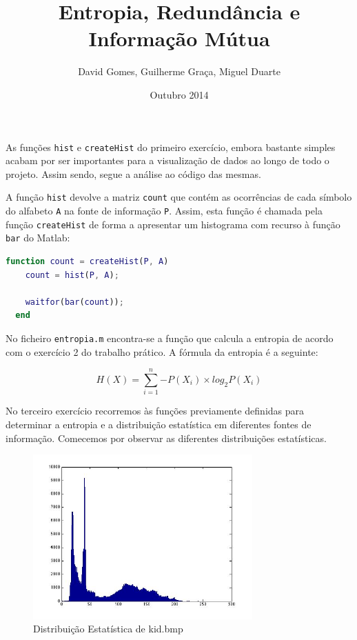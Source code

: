\documentclass[12pt]{article}
\title{Entropia, Redundância e Informação Mútua}
\author{David Gomes, Guilherme Graça, Miguel Duarte}
\date{Outubro 2014}
\begin{document}
\maketitle
  As funções \texttt{hist} e \texttt{createHist} do primeiro exercício, embora bastante
  simples acabam por ser importantes para a visualização de dados ao longo
  de todo o projeto. Assim sendo, segue a análise ao código das mesmas.

  A função \texttt{hist} devolve a matriz \texttt{count} que contém as ocorrências
  de cada símbolo do alfabeto \texttt{A} na fonte de informação \texttt{P}. Assim,
  esta função é chamada pela função \texttt{createHist} de forma a apresentar um histograma
  com recurso à função \texttt{bar} do Matlab:

  \vspace{2mm}
  \begin{lstlisting}[language=Matlab]
  function count = createHist(P, A)
    count = hist(P, A);

    waitfor(bar(count));
  end
  \end{lstlisting}

  No ficheiro \texttt{entropia.m} encontra-se a função que calcula a entropia de acordo
  com o exercício 2 do trabalho prático. A fórmula da entropia é a seguinte:

  $$
    H(X) = \sum_{i=1}^{n}{-P(X_i) \times log_2 P(X_i)}
  $$

  No terceiro exercício recorremos às funções previamente definidas para determinar
  a entropia e a distribuição estatística em diferentes fontes de informação.
  Comecemos por observar as diferentes distribuições estatísticas.

  \begin{figure}[H]
    \centering
      \includegraphics[width=0.75\textwidth]{ex3kid}
    \caption{Distribuição Estatística de kid.bmp}
  \end{figure}
\end{document}
